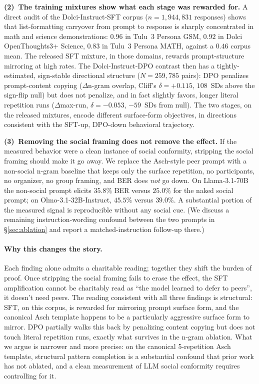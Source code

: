 \documentclass{article}
\begin{document}
\textbf{(2)~The training mixtures show what each stage was rewarded for.} A direct audit of the Dolci-Instruct-SFT corpus ($n{=}1{,}944{,}831$ responses) shows that list-formatting carryover from prompt to response is sharply concentrated in math and science demonstrations: $0.96$ in Tulu~3 Persona GSM, $0.92$ in Dolci OpenThoughts3+ Science, $0.83$ in Tulu~3 Persona MATH, against a $0.46$ corpus mean. The released SFT mixture, in those domains, rewards prompt-structure mirroring at high rates. The Dolci-Instruct-DPO contrast then has a tightly-estimated, sign-stable directional structure ($N{=}259{,}785$ pairs): DPO penalizes prompt-content copying ($\Delta$n-gram overlap, Cliff's $\delta{=}{+}0.115$, $108$~SDs above the sign-flip null) but does not penalize, and in fact slightly favors, longer literal repetition runs ($\Delta$max-run, $\delta{=}{-}0.053$, $-59$~SDs from null). The two stages, on the released mixtures, encode different surface-form objectives, in directions consistent with the SFT-up, DPO-down behavioral trajectory.

\textbf{(3)~Removing the social framing does not remove the effect.} If the measured behavior were a clean instance of social conformity, stripping the social framing should make it go away. We replace the Asch-style peer prompt with a non-social n-gram baseline that keeps only the surface repetition, no participants, no organizer, no group framing, and BER does \emph{not} go down. On Llama-3.1-70B the non-social prompt elicits $35.8\%$ BER versus $25.0\%$ for the naked social prompt; on Olmo-3.1-32B-Instruct, $45.5\%$ versus $39.0\%$. A substantial portion of the measured signal is reproducible without any social cue. (We discuss a remaining instruction-wording confound between the two prompts in \S\ref{sec:ablation} and report a matched-instruction follow-up there.)

\paragraph{Why this changes the story.}
Each finding alone admits a charitable reading; together they shift the burden of proof. Once stripping the social framing fails to erase the effect, the SFT amplification cannot be charitably read as ``the model learned to defer to peers'', it doesn't need peers. The reading consistent with all three findings is structural: SFT, on this corpus, is rewarded for mirroring prompt surface form, and the canonical Asch template happens to be a particularly aggressive surface form to mirror. DPO partially walks this back by penalizing content copying but does not touch literal repetition runs, exactly what survives in the n-gram ablation. What we argue is narrower and more precise: on the canonical 5-repetition Asch template, structural pattern completion is a substantial confound that prior work has not ablated, and a clean measurement of LLM social conformity requires controlling for it.
\end{document}
